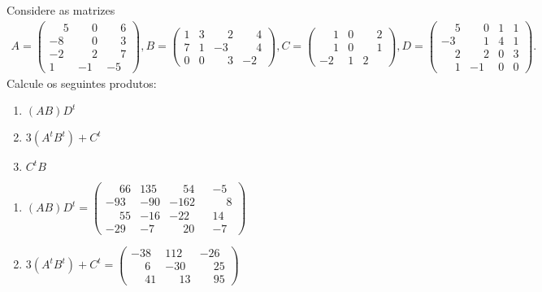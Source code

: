 \documentclass[12pt]{exam}
\begin{document}
\begin{exercicio}
    Considere as matrizes
    \begin{align*}
        A = \begin{pmatrix}\phantom{-} 5 & \phantom{-} 0 & \phantom{-} 6\\-8 & \phantom{-} 0 & \phantom{-} 3\\-2 & \phantom{-} 2 & \phantom{-} 7\\1 & -1 & -5\end{pmatrix},
        B = \begin{pmatrix}1 & 3 & \phantom{-} 2 & \phantom{-} 4\\7 & 1 & -3 & \phantom{-} 4\\0 & 0 & \phantom{-} 3 & -2\end{pmatrix},
        C = \begin{pmatrix}\phantom{-} 1 & 0 & \phantom{-} 2\\\phantom{-} 1 & 0 & \phantom{-} 1\\-2 & 1 & 2\end{pmatrix},
        D = \begin{pmatrix}\phantom{-} 5 & \phantom{-} 0 & 1 & 1\\-3 & \phantom{-} 1 & 4 & 1\\\phantom{-} 2 & \phantom{-} 2 & 0 & 3\\\phantom{-} 1 & -1 & 0 & 0\end{pmatrix}.
    \end{align*}
    Calcule os seguintes produtos:
    \begin{enumerate}[label={\alph*})]
        \item $(AB)D^t$
        \item $3(A^tB^t) + C^t$
        \item $C^tB$
    \end{enumerate}
    \begin{solucao}
        \begin{enumerate}
            \item $(AB)D^t = \begin{pmatrix}\phantom{-} 66 & 135 & \phantom{-} 54 & -5\\-93 & -90 & -162 & \phantom{-} 8\\
                \phantom{-} 55 & -16 & -22 \phantom{-} & 14\\ -29 & -7 & \phantom{-} 20 & -7\end{pmatrix}$
            \item $3(A^tB^t) + C^t = \begin{pmatrix}-38 & 112 & -26\\\phantom{-} 6 & -30 & \phantom{-} 25\\\phantom{-} 41 & \phantom{-} 13 & \phantom{-} 95\end{pmatrix}$

\end{enumerate}
\end{solucao}
\end{exercicio}
\end{document}
